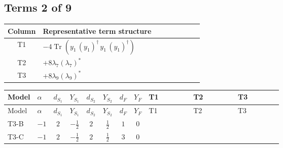 \documentclass[8pt]{article}
\begin{document}
\begin{landscape}
\subsection*{Terms 2 of 9}
\begin{center}
\begin{tabular}{@{}c >{\raggedright\arraybackslash}p{0.82\linewidth}@{}}
\toprule
Column & Representative term structure \\
\midrule
T1 & \(\displaystyle -4 \operatorname{Tr}\!\left({y_1}\,\left({y_1}\right)^{\dagger}\,{y_1}\,\left({y_1}\right)^{\dagger}\right)\) \\
\midrule
T2 & \(\displaystyle +8 {\lambda_7} \left({\lambda_7}\right)^{*}\) \\
\midrule
T3 & \(\displaystyle +8 {\lambda_9} \left({\lambda_9}\right)^{*}\) \\
\midrule
\bottomrule
\end{tabular}
\end{center}
\smallskip
\tiny
\begin{longtable}{@{}llcccccc >{\raggedright\arraybackslash}p{0.21\linewidth} >{\raggedright\arraybackslash}p{0.21\linewidth} >{\raggedright\arraybackslash}p{0.21\linewidth}@{}}
\toprule
Model & $\alpha$ & $d_{S_1}$ & $Y_{S_1}$ & $d_{S_2}$ & $Y_{S_2}$ & $d_F$ & $Y_F$ & T1 & T2 & T3 \\
\midrule
\endfirsthead
\toprule
Model & $\alpha$ & $d_{S_1}$ & $Y_{S_1}$ & $d_{S_2}$ & $Y_{S_2}$ & $d_F$ & $Y_F$ & T1 & T2 & T3 \\
\midrule
\endhead
T3-B & $-1$ & $2$ & $-\frac{1}{2}$ & $2$ & $\frac{1}{2}$ & $1$ & $0$ & \scriptsize\adjustbox{max width=\linewidth}{$\begin{gathered} -4 \operatorname{Tr}\!\left({y_1}\,\left({y_1}\right)^{\dagger}\,{y_1}\,\left({y_1}\right)^{\dagger}\right)\end{gathered}$} & \scriptsize\adjustbox{max width=\linewidth}{$\begin{gathered} +8 {\lambda_7} \left({\lambda_7}\right)^{*}\end{gathered}$} & \scriptsize\adjustbox{max width=\linewidth}{$\begin{gathered} +8 {\lambda_9} \left({\lambda_9}\right)^{*}\end{gathered}$} \\
\midrule
T3-C & $-1$ & $2$ & $-\frac{1}{2}$ & $2$ & $\frac{1}{2}$ & $3$ & $0$ & \scriptsize\adjustbox{max width=\linewidth}{$\begin{gathered} -5 \operatorname{Tr}\!\left({y_1}\,\left({y_1}\right)^{\dagger}\,{y_1}\,\left({y_1}\right)^{\dagger}\right)\end{gathered}$} & \scriptsize\adjustbox{max width=\linewidth}{$\begin{gathered} +8 {\lambda_7} \left({\lambda_7}\right)^{*}\end{gathered}$} & \scriptsize\adjustbox{max width=\linewidth}{$\begin{gathered} +8 {\lambda_9} \left({\lambda_9}\right)^{*}\end{gathered}$} \\

\end{longtable}
\end{landscape}
\end{document}
